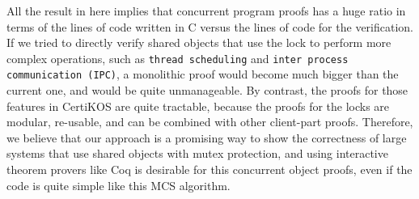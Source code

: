 All the result in here implies that concurrent program proofs has a huge ratio in terms of the lines of code written in C versus the lines of code for the verification.
If we tried to directly verify shared objects that use the lock to  perform more complex operations, such as \texttt{thread scheduling} and \texttt{inter process communication (IPC)}, a monolithic proof would become much bigger than the current one, and would be quite unmanageable.
By contrast, the proofs for those features in CertiKOS are quite tractable, because the proofs for the locks are modular, re-usable, and can be combined with other client-part proofs. 
Therefore, we believe that our approach is a promising way to show the correctness of large systems that use shared objects with mutex protection, and using interactive theorem provers like Coq is desirable for this concurrent object proofs, even if the code is quite simple like this MCS algorithm. 

